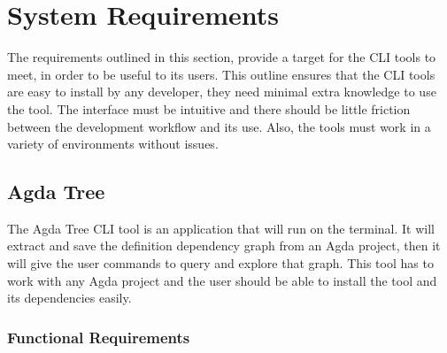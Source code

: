 
\chapter{System Requirements} \label{ch:system requirements}

The requirements outlined in this section, provide a target for the CLI tools
to meet, in order to be useful to its users. This outline ensures that the CLI
tools are easy to install by any developer, they need minimal extra knowledge
to use the tool. The interface must be intuitive and there should be little
friction between the development workflow and its use. Also, the tools must
work in a variety of environments without issues.

\section{Agda Tree}

The Agda Tree CLI tool is an application that will run on the terminal. It will
extract and save the definition dependency graph from an Agda project, then it
will give the user commands to query and explore that graph. This tool has to
work with any Agda project and the user should be able to install the tool and
its dependencies easily.

\subsection{Functional Requirements}

